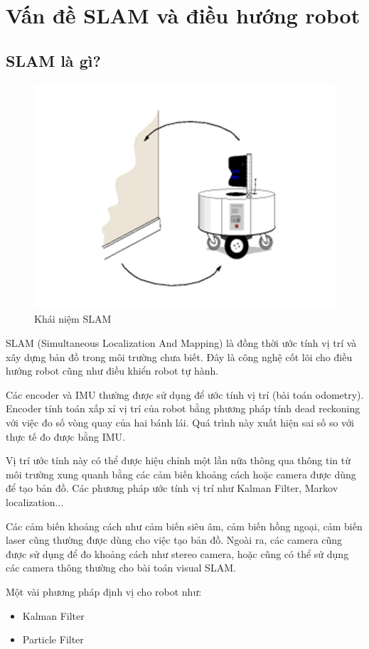 \section{Vấn đề SLAM và điều hướng robot}
\subsection{SLAM là gì?}
\begin{figure}[tph]
	\centering
	\includegraphics[width=0.7\linewidth]{chapter2/figs/slam}
	\caption{Khái niệm SLAM}
	\label{fig:slam}
\end{figure}
SLAM (Simultaneous Localization And Mapping) là đồng thời ước tính vị trí và xây dựng bản đồ trong môi trường chưa biết. Đây là công nghệ cốt lõi cho điều hướng robot cũng như điều khiển robot tự hành.

Các encoder và IMU thường được sử dụng để ước tính vị trí (bài toán odometry). Encoder tính toán xấp xỉ vị trí của robot bằng phương pháp tính dead reckoning với việc đo số vòng quay của hai bánh lái. Quá trình này xuất hiện sai số so với thực tế đo được bằng IMU. 

Vị trí ước tính này có thể được hiệu chỉnh một lần nữa  thông qua thông tin từ môi trường xung quanh bằng các cảm biến khoảng cách hoặc camera được dùng để tạo bản đồ. Các phương pháp ước tính vị trí như Kalman Filter, Markov localization...

Các cảm biến khoảng cách như cảm biến siêu âm, cảm biến hồng ngoại, cảm biến laser cũng thường được dùng cho việc tạo bản đồ. Ngoài ra, các camera cũng được sử dụng để đo khoảng cách như stereo camera, hoặc cũng có thể sử dụng các camera thông thường cho bài toán visual SLAM.

Một vài phương pháp định vị cho robot như:
\begin{itemize}
	\item Kalman Filter
	\item Particle Filter
\end{itemize}

